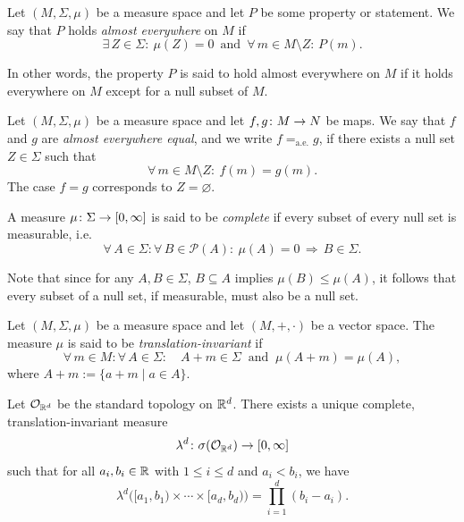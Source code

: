 \begin{definition}
Let $(M,\Sigma,\mu)$ be a measure space and let $P$ be some property or statement. We say that $P$ holds \emph{almost everywhere} on $M$ if
\begin{equation*}
\exists \, Z\in \Sigma : \ \mu(Z) = 0 \, \text{ and } \, \forall \, m\in M\setminus Z : \, P(m).
\end{equation*}
\end{definition}
In other words, the property $P$ is said to hold almost everywhere on $M$ if it holds everywhere on $M$ except for a null subset of $M$.
\begin{example}
Let $(M,\Sigma,\mu)$ be a measure space and let $f,g\colon M\to N$ be maps. We say that $f$ and $g$ are \emph{almost everywhere equal}, and we write $f=_{\mathrm{a.e.}}g$, if there exists a null set $Z\in \Sigma$ such that
\begin{equation*}
\forall \, m\in M\setminus Z : \ f(m)=g(m).
\end{equation*}
The case $f=g$ corresponds to $Z=\varnothing$.
\end{example}

\begin{definition}
A measure $\mu\colon \Sigma\to [0,\infty]$ is said to be \emph{complete} if every subset of every null set is measurable, i.e.\
\begin{equation*}
\forall \, A\in \Sigma :\forall \, B\in\mathscr{P}(A) : \ \mu(A)=0 \,\Rightarrow \, B\in\Sigma.
\end{equation*}
\end{definition}
Note that since for any $A,B\in\Sigma$, $B\subseteq A$ implies $\mu(B)\leq\mu(A)$, it follows that every subset of a null set, if measurable, must also be a null set.

\begin{definition}
Let $(M,\Sigma,\mu)$ be a measure space and let $(M,+,\cdot)$ be a vector space. The measure $\mu$ is said to be \emph{translation-invariant} if
\begin{equation*}
\forall \, m\in M : \forall \, A\in \Sigma : \quad A+m\in\Sigma\ \text{ and }\ \mu(A+m)=\mu(A),
\end{equation*}
where $A+m := \{a+m\mid a\in A\}$.
\end{definition}

\begin{theorem}
Let $\mathcal{O}_{\mathbb{R}^d}$ be the standard topology on $\mathbb{R}^d$. There exists a unique complete, translation-invariant measure 
\begin{equation*}
\lambda^d\colon\sigma(\mathcal{O}_{\mathbb{R}^d})\to[0,\infty]
\end{equation*}
such that for all $a_i,b_i\in\mathbb{R}$ with $1\leq i\leq d$ and $a_i<b_i$, we have
\begin{equation*}
\lambda^d\bigl([a_1,b_1)\times\cdots\times[a_d,b_d)\bigr) = \prod_{i=1}^d(b_i-a_i).
\end{equation*}
\end{theorem}

